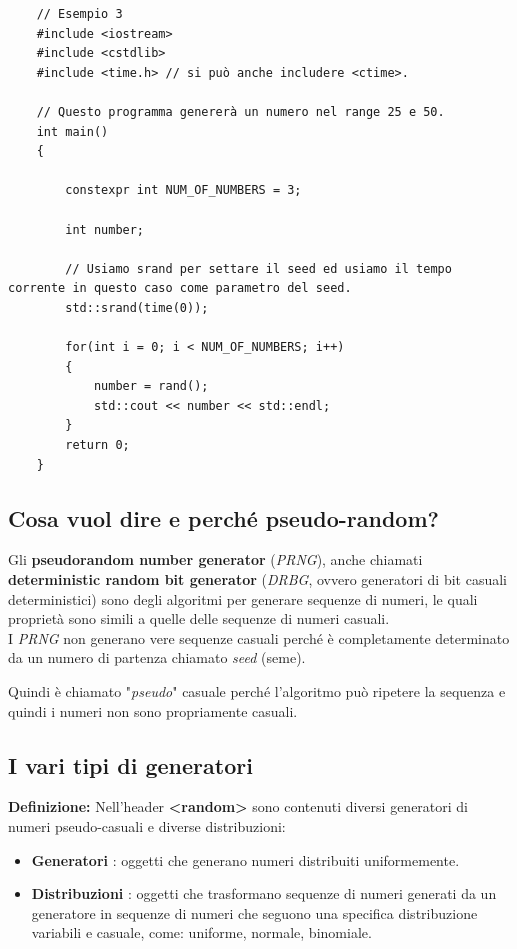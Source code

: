 \begin{lstlisting}
	// Esempio 3
	#include <iostream>
	#include <cstdlib>
	#include <time.h> // si può anche includere <ctime>.
	
	// Questo programma genererà un numero nel range 25 e 50.
	int main()
	{
		
		constexpr int NUM_OF_NUMBERS = 3;
		
		int number;
		
		// Usiamo srand per settare il seed ed usiamo il tempo corrente in questo caso come parametro del seed.
		std::srand(time(0));
		
		for(int i = 0; i < NUM_OF_NUMBERS; i++)
		{
			number = rand();
			std::cout << number << std::endl;
		}
		return 0;
	}
\end{lstlisting}

\subsection{Cosa vuol dire e perché pseudo-random?}

\textsf{\small Gli \textbf{pseudorandom number generator} (\emph{PRNG}), anche chiamati \textbf{deterministic random bit generator} (\emph{DRBG}, ovvero generatori di bit casuali deterministici) sono degli algoritmi per generare sequenze di numeri, le quali proprietà sono simili a quelle delle sequenze di numeri casuali.} \\

\textsf{\small I \emph{PRNG} non generano vere sequenze casuali perché è completamente determinato da un numero di partenza chiamato \emph{seed} (seme).} \break

\textsf{\small Quindi è chiamato "\emph{pseudo}" casuale perché l'algoritmo può ripetere la sequenza e quindi i numeri non sono propriamente casuali.} \\

\subsection{I vari tipi di generatori}

\textsf{\small \textbf{Definizione: } Nell'header \textbf{<random>} sono contenuti diversi generatori di numeri pseudo-casuali e diverse distribuzioni:} \\

\begin{itemize}
	\item \textsf{\small \textbf{Generatori} : oggetti che generano numeri distribuiti uniformemente.}
	\item \textsf{\small \textbf{Distribuzioni} : oggetti che trasformano sequenze di numeri generati da un generatore in sequenze di numeri che seguono una specifica distribuzione variabili e casuale, come: uniforme, normale, binomiale.}
\end{itemize}

